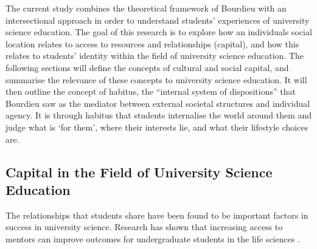 The current study combines the theoretical framework of Bourdieu with an intersectional approach in order to understand students' experiences of university science education. The goal of this research is to explore how an individuals social location relates to access to resources and relationships (capital), and how this relates to students' identity within the field of university science education. The following sections will define the concepts of cultural and social capital, and summarise the relevance of these concepts to university science education. It will then outline the concept of habitus, the ``internal system of dispositions'' that Bourdieu saw as the mediator between external societal structures and individual agency. It is through habitus that students internalise the world around them and judge what is `for them', where their interests lie, and what their lifestyle choices are. 

\subsection{Capital in the Field of University Science Education}

The relationships that students share have been found to be important factors in success in university science. Research has shown that increasing access to mentors can improve outcomes for undergraduate students in the life sciences \citep{aikens2016social}. 

